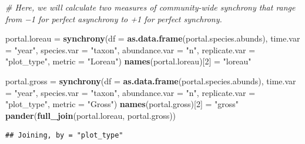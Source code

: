 \documentclass[]{article}
\newenvironment{Shaded}{\begin{snugshade}}{\end{snugshade}}
\newcommand{\KeywordTok}[1]{\textcolor[rgb]{0.13,0.29,0.53}{\textbf{{#1}}}}
\newcommand{\DataTypeTok}[1]{\textcolor[rgb]{0.13,0.29,0.53}{{#1}}}
\newcommand{\DecValTok}[1]{\textcolor[rgb]{0.00,0.00,0.81}{{#1}}}
\newcommand{\StringTok}[1]{\textcolor[rgb]{0.31,0.60,0.02}{{#1}}}
\newcommand{\CommentTok}[1]{\textcolor[rgb]{0.56,0.35,0.01}{\textit{{#1}}}}
\newcommand{\NormalTok}[1]{{#1}}
\begin{document}
\begin{Shaded}
\begin{Highlighting}[]
\CommentTok{# Here, we will calculate two measures of community-wide synchrony that range from −1 for perfect asynchrony to +1 for perfect synchrony.}

\NormalTok{portal.loreau =}\StringTok{ }\KeywordTok{synchrony}\NormalTok{(}\DataTypeTok{df =} \KeywordTok{as.data.frame}\NormalTok{(portal.species.abunds), }\DataTypeTok{time.var =} \StringTok{"year"}\NormalTok{,}
                \DataTypeTok{species.var =} \StringTok{"taxon"}\NormalTok{,}
                \DataTypeTok{abundance.var =} \StringTok{"n"}\NormalTok{,}
                \DataTypeTok{replicate.var =} \StringTok{"plot_type"}\NormalTok{,}
                \DataTypeTok{metric =} \StringTok{"Loreau"}\NormalTok{)}
\KeywordTok{names}\NormalTok{(portal.loreau)[}\DecValTok{2}\NormalTok{] =}\StringTok{ "loreau"}

\NormalTok{portal.gross =}\StringTok{ }\KeywordTok{synchrony}\NormalTok{(}\DataTypeTok{df =} \KeywordTok{as.data.frame}\NormalTok{(portal.species.abunds), }\DataTypeTok{time.var =} \StringTok{"year"}\NormalTok{,}
               \DataTypeTok{species.var =} \StringTok{"taxon"}\NormalTok{,}
               \DataTypeTok{abundance.var =} \StringTok{"n"}\NormalTok{,}
               \DataTypeTok{replicate.var =} \StringTok{"plot_type"}\NormalTok{,}
               \DataTypeTok{metric =} \StringTok{"Gross"}\NormalTok{)}
\KeywordTok{names}\NormalTok{(portal.gross)[}\DecValTok{2}\NormalTok{] =}\StringTok{ "gross"}
\KeywordTok{pander}\NormalTok{(}\KeywordTok{full_join}\NormalTok{(portal.loreau, portal.gross))}
\end{Highlighting}
\end{Shaded}

\begin{verbatim}
## Joining, by = "plot_type"
\end{verbatim}
\end{document}
